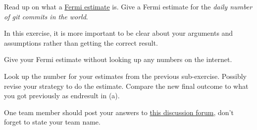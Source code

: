 \documentclass[a4paper,10pt,landscape,twocolumn]{scrartcl}
\begin{document}
\begin{exercise}
Read up on what a
\href{https://en.wikipedia.org/wiki/Fermi_problem}{Fermi estimate}
is. Give a Fermi estimate for the \emph{daily number of git commits
in the world}.
 
In this exercise, it is more important to be clear about your
arguments and assumptions rather than getting the correct result.

\begin{subex}[(4pt)]
Give your Fermi estimate without looking up any numbers on the internet.
\end{subex}

\begin{subex}[(4pt)]
Look up the number for your estimates from the previous
sub-exercise. Possibly revise your strategy to do the
estimate. Compare the new final outcome to what you got previously as
endresult in (a).
\end{subex}

One team member should post your answers to
\href{https://canvas.uva.nl/courses/2205/discussion_topics/23268}{this
  discussion forum}, don't forget to state your team name.
\end{exercise}

\newcommand{\lang}{\textit{lang}}
\newcommand{\coll}{\textit{coll}}
\end{document}
